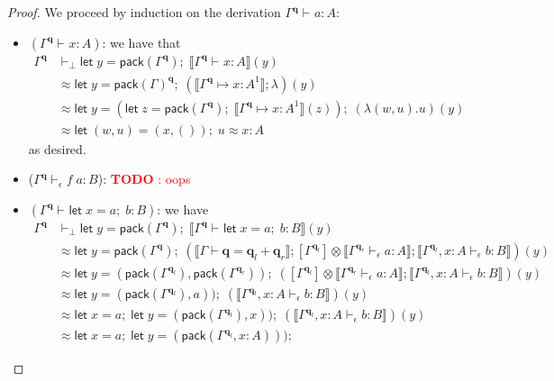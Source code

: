 \documentclass[acmsmall,screen,review]{acmart}
\newcounter{todos}
\newcommand{\todo}[1]{\stepcounter{todos} \textcolor{red}{\textbf{TODO \arabic{todos}}: #1}}
\newcommand{\mb}[1]{\ensuremath{\mathbf{#1}}}
\newcommand{\ms}[1]{\ensuremath{\mathsf{#1}}}
\newcommand{\letexpr}[3]{\ensuremath{\ms{let}\;#1 = #2;\;#3}}
\newcommand{\qsp}[4]{#1 \vdash #2 = #3 + #4}
\newcommand{\cwk}[2]{#1 \mapsto #2}
\newcommand{\hasty}[4]{#1 \vdash_{#2} #3: {#4}}
\newcommand{\dnt}[1]{\llbracket{#1}\rrbracket}
\begin{document}
\begin{proof}
  We proceed by induction on the derivation $\hasty{\Gamma^{\mb{q}}}{}{a}{A}$:
  \begin{itemize}
    \item $(\hasty{\Gamma^{\mb{q}}}{}{x}{A})$: we have that
    \begin{align*}
    \Gamma^{\mb{q}} &\vdash_\bot 
      \letexpr{y}{\ms{pack}(\Gamma^{\mb{q}})}{\dnt{\hasty{\Gamma^{\mb{q}}}{}{x}{A}}(y)} \\
      &\approx 
      \letexpr{y}{\ms{pack}(\Gamma)^{\mb{q}}}{(\dnt{\cwk{\Gamma^{\mb{q}}}{x : A^1}} ; \lambda)(y)} \\
      &\approx
      \letexpr{y}{
        (\letexpr{z}
          {\ms{pack}(\Gamma^{\mb{q}})}{\dnt{\cwk{\Gamma^{\mb{q}}}{x : A^1}}(z)})}
        {(\lambda (w, u) . u)(y)} \\
      &\approx
      \letexpr{(w, u)}{(x, ())}{u} \approx x : A
    \end{align*}
    as desired.
    \item ($\hasty{\Gamma^{\mb{q}}}{\epsilon}{f\;a}{B}$): \todo{oops}
    \item $(\hasty{\Gamma^{\mb{q}}}{}{\letexpr{x}{a}{b}}{B})$: we have
    \begin{align*}
    \Gamma^{\mb{q}} &\vdash_\bot 
      \letexpr{y}{\ms{pack}(\Gamma^{\mb{q}})}
        {\dnt{\hasty{\Gamma^{\mb{q}}}{}{\letexpr{x}{a}{b}}{B}}(y)} \\
      &\approx
      \letexpr{y}{\ms{pack}(\Gamma^{\mb{q}})}{
        (
          \dnt{\qsp{\Gamma}{\mb{q}}{\mb{q}_l}{\mb{q}_r}}
          ; [\Gamma^{\mb{q}_l}] \otimes \dnt{\hasty{\Gamma^{\mb{q}_r}}{\epsilon}{a}{A}}
          ; \dnt{\hasty{\Gamma^{\mb{q}_l}, x : A}{\epsilon}{b}{B}}
        )(y)
      } \\
      &\approx
      \letexpr{y}{(\ms{pack}(\Gamma^{\mb{q}_l}), \ms{pack}(\Gamma^{\mb{q}_r}))}{
        (
          [\Gamma^{\mb{q}_l}] \otimes \dnt{\hasty{\Gamma^{\mb{q}_r}}{\epsilon}{a}{A}}
          ; \dnt{\hasty{\Gamma^{\mb{q}_l}, x : A}{\epsilon}{b}{B}}
        )(y)
      }
      \\
      &\approx
      \letexpr{y}{(\ms{pack}(\Gamma^{\mb{q}_l}), a))}{
        (
          \dnt{\hasty{\Gamma^{\mb{q}_l}, x : A}{\epsilon}{b}{B}}
        )(y)
      }
      \\
      &\approx
      \letexpr{x}{a}{\letexpr{y}{(\ms{pack}(\Gamma^{\mb{q}_l}), x))}{
        (
          \dnt{\hasty{\Gamma^{\mb{q}_l}, x : A}{\epsilon}{b}{B}}
        )(y)
      }}
      \\
      &\approx
      \letexpr{x}{a}{\letexpr{y}{(\ms{pack}(\Gamma^{\mb{q}_l}, x : A)))}{
}}
\end{align*}
\end{itemize}
\end{proof}
\end{document}
